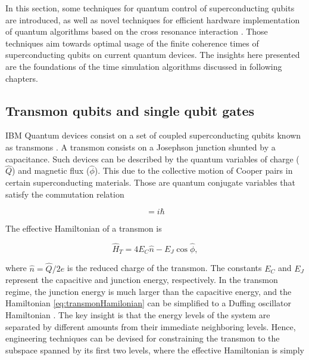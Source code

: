   In this section, some techniques for quantum control of superconducting qubits are introduced, as well as novel techniques for efficient hardware implementation of quantum algorithms based on the cross resonance interaction \cite{RXZPulseEfficient, 2016RZXCalibration}. Those techniques aim towards optimal usage of the finite coherence times of superconducting qubits on current quantum devices. The insights here presented are the foundations of the time simulation algorithms discussed in following chapters.

  \subsection{Transmon qubits and single qubit gates}
  \label{subsec:TransmonQubits}

    IBM Quantum devices consist on a set of coupled superconducting qubits known as transmons \cite{Qiskit, quantumEngineer}. A transmon consists on a Josephson junction shunted by a capacitance. Such devices can be described by the quantum variables of charge ($\hat{Q}$) and magnetic flux ($\hat{\phi}$). This due to the collective motion of Cooper pairs in certain superconducting materials. Those are quantum conjugate variables that satisfy the commutation relation

    \begin{equation}
      [\hat{Q}, \hat{\phi}] = i\hbar
      \label{eq:CommutationFluxCharge}
    \end{equation}
    
    The effective Hamiltonian of a transmon is \cite{quantumEngineer}

    \begin{equation}
      \hat{H}_T = 4E_C \hat{n} - E_J \cos{\hat{\phi}},
      \label{eq:transmonHamilonian}
    \end{equation}

    \noindent where $\hat{n} = \hat{Q}/2e$ is the reduced charge of the transmon. The constants $E_C$ and $E_J$ represent the capacitive and junction energy, respectively. In the transmon regime, the junction energy is much larger than the capacitive energy, and the Hamiltonian \ref{eq:transmonHamilonian} can be simplified to a Duffing oscillator Hamiltonian \cite{quantumEngineer}. The key insight is that the energy levels of the system are separated by different amounts from their immediate neighboring levels. Hence, engineering techniques can be devised for constraining the transmon to the subspace spanned by its first two levels, where the effective Hamiltonian is simply

